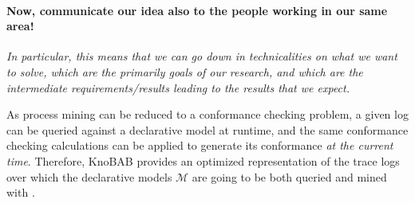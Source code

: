 

\medskip


\paragraph*{Now, communicate our idea also to the people working in our same area!} \textit{In particular, this means that we can go down in technicalities on what we want to solve, which are the primarily goals of our research, and which are the intermediate requirements/results leading to the results that we expect.} 

As process mining can be reduced to a conformance checking problem, a given log can be queried against a declarative model at runtime, and the same conformance checking calculations can be applied to generate its conformance \emph{at the current time}. Therefore, KnoBAB provides an optimized representation of the trace logs over which the declarative models $\mathcal{M}$ are going to be both queried and mined with \LTLf.

